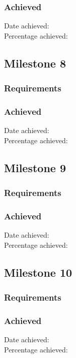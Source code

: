 \documentclass[a4paper, 12pt]{memoir}
\begin{document}
\subsubsection{Achieved}
Date achieved:		\\
Percentage achieved:	\\

\subsection{Milestone 8}
\subsubsection{Requirements}
\subsubsection{Achieved}
Date achieved:		\\
Percentage achieved:	\\

\subsection{Milestone 9}
\subsubsection{Requirements}
\subsubsection{Achieved}
Date achieved:		\\
Percentage achieved:	\\

\subsection{Milestone 10}
\subsubsection{Requirements}
\subsubsection{Achieved}
Date achieved:		\\
Percentage achieved:	\\
\end{document}
